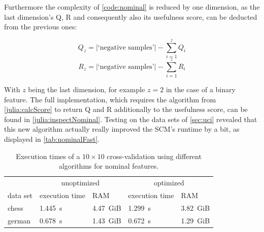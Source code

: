 Furthermore the complexity of \autoref{code:nominal} is reduced by one dimension, as the last dimension's
Q, R and consequently also its usefulness score, can be deducted from the previous ones:

\[Q_z = |\text{`negative samples'}| - \sum_{i=1}^z Q_i\]
\[R_z = |\text{`negative samples'}| - \sum_{i=1}^z R_i\]

With \(z\) being the last dimension, for example \(z=2\) in the case of a binary feature.
The full implementation, which requires the algorithm from \autoref{julia:calcScore}
to return Q and R additionally to the usefulness score, can be found in \autoref{julia:inspectNominal}.
Testing on the data sets of \autoref{sec:uci} revealed that this new algorithm actually really
improved the SCM's runtime by a bit, as displayed in \autoref{tab:nominalFast}.

\begin{table}[ht]
    \centering
    \caption{Execution times of a \(10 \times 10\) cross-validation using different algorithms for nominal features.}\label{tab:nominalFast}
    \begin{tabular}{lllll}
        \toprule
        & \multicolumn{2}{c}{unoptimized} & \multicolumn{2}{c}{optimized} \\
        data set & execution time & RAM & execution time & RAM \\
        \midrule
        chess & 1.445~s & 4.47~GiB & 1.299~s & 3.82~GiB \\
        german & 0.678~s & 1.43~GiB & 0.672~s & 1.29~GiB \\
        \bottomrule
    \end{tabular}
\end{table}